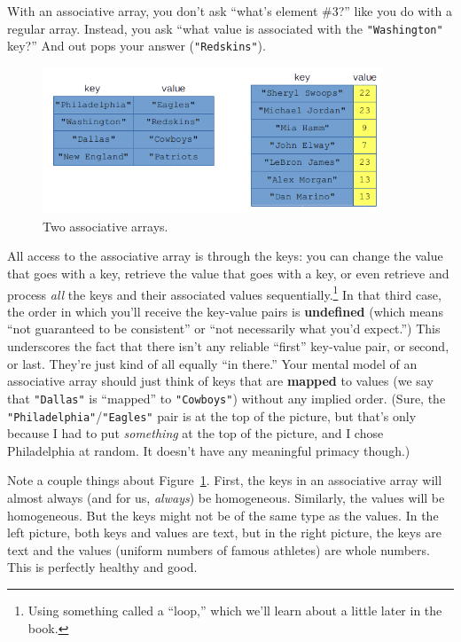 With an associative array, you don't ask ``what's element \#3?'' like you do
with a regular array. Instead, you ask ``what value is associated with the
\texttt{"Washington"} key?'' And out pops your answer (\texttt{"Redskins"}).

\begin{figure}[ht]
\centering
\includegraphics[width=0.9\textwidth]{assocArray.png}
\caption{Two associative arrays.}
\label{fig:assocArray}
\end{figure}

All access to the associative array is through the keys: you can change the
value that goes with a key, retrieve the value that goes with a key, or even
retrieve and process \textit{all} the keys and their associated values
sequentially.\footnote{Using something called a ``loop,'' which we'll learn
about a little later in the book.} In that third case, the order in which
you'll receive the key-value pairs is \textbf{undefined} (which means ``not
guaranteed to be consistent'' or ``not necessarily what you'd expect.'') This
underscores the fact that there isn't any reliable ``first'' key-value pair,
or second, or last. They're just kind of all equally ``in there.'' Your mental
model of an associative array should just think of keys that are
\textbf{mapped} to values (we say that \texttt{"Dallas"} is ``mapped'' to
\texttt{"Cowboys"}) without any implied order. (Sure, the
\texttt{"Philadelphia"}/\texttt{"Eagles"} pair is at the top of the picture,
but that's only because I had to put \textit{something} at the top of the
picture, and I chose Philadelphia at random. It doesn't have any meaningful
primacy though.)

 Note a couple things about Figure~\ref{fig:assocArray}.
First, the keys in an associative array will almost always (and for us,
\textit{always}) be homogeneous. Similarly, the values will be homogeneous. But
the keys might not be of the same type as the values. In the left picture, both
keys and values are text, but in the right picture, the keys are text and the
values (uniform numbers of famous athletes) are whole numbers. This is
perfectly healthy and good.

